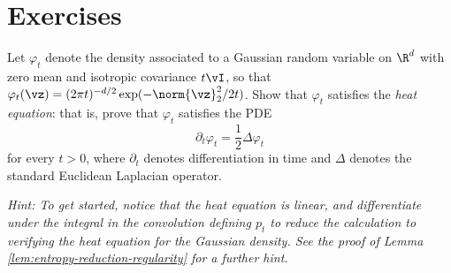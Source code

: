 \documentclass[../../book-main.tex]{subfiles}
\begin{document}
\section{Exercises}

\begin{exercise}\label{exercise:gaussian-heat}
  Let $\varphi_t$ denote the density associated to a Gaussian random variable on
  $\R^d$
  with zero mean and isotropic covariance $t\vI$, so that $\varphi_t(\vz)
  = (2\pi t)^{-d/2} \exp(-\norm{\vz}_2^2/2t)$.
  Show that $\varphi_t$ satisfies the \textit{heat equation}: that is,
  prove that $\varphi_t$ satisfies the PDE
  \begin{equation*}
    \partial_t \varphi_t = \frac{1}{2}\Delta \varphi_t
  \end{equation*}
  for every $t > 0$, where $\partial_t$ denotes differentiation in time and
  $\Delta$ denotes the standard Euclidean Laplacian operator.

  \textit{Hint: To get started, notice that the heat equation is linear, and
  differentiate under the integral in the convolution defining $p_t$ to reduce the
  calculation to verifying the heat equation for the Gaussian density. See the
  proof of Lemma \ref{lem:entropy-reduction-regularity} for a further hint.}
\end{exercise}
\end{document}
